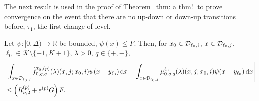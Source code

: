  The next result is used in the proof of Theorem~\ref{thm: a thm!} to prove convergence on the event that there are no up-down or down-up transitions before, \(\tau_1\), the first change of level.
 \begin{lem}\label{lem: Dcoajc}
	Let \(\psi:[0,\Delta)\to \mathbb R\) be bounded, \(\psi(x)\leq F\). Then, for \(x_0\in\mathcal{D}_{\ell_0,i}\), \(x\in\mathcal{D}_{\ell_0,j}\), \(\ell_0\in\mathcal K\setminus\{-1,K+1\}\), \(\lambda > 0\), \(q\in\{+,-\}\), 
	\begin{align}
		&\left|\int_{x\in\mathcal D_{\ell_0,j}} \widehat f^{\ell_0,(p)}_{0,q,q}(\lambda)(x,j; x_0,i)\psi(x-y_{\ell_0})\, \mathrm{d} x - \int_{x\in\mathcal D_{\ell_0,j}} \mu^{\ell_0}_{0,q,q}(\lambda)(x,j; x_0,i)\psi(x-y_{\ell_0})\, \mathrm{d} x\right| \nonumber 
		\\&\leq \left(R_{{\boldsymbol v},2}^{(p)} + \varepsilon^{(p)}G\right) F.
		\label{eqn: anue}
	\end{align} 
\end{lem}
